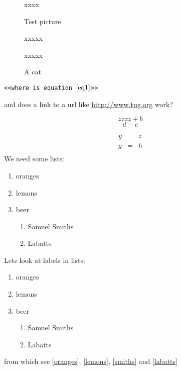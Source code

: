 \documentclass[]{book}
\newcommand{\eqnref}[1]{{equation~$\ref{#1}$}}
\begin{document}
\begin{figure}

xxxx

\hypertarget{testpiccy}{Test picture}

xxxxx

xxxxx
\caption{{A cat}}
\label{fig1}
\end{figure}

\texttt{<<where is \eqnref{eq1}>>}

and does a link to a url like \url{http://www.tug.org} work?

\begin{equation}
  \label{eq1}
  zzzz + b
\end{equation}
\newpage
\begin{equation}
  \label{eq2}
  d - e
\end{equation}

\begin{eqnarray}
  \label{eq3}
  y &=&z\\
  g &=&h\\
\end{eqnarray}
We need some lists:
\begin{enumerate}
\item oranges
\item lemons
\item beer
  \begin{enumerate}
  \item Samuel Smiths
  \item Labatts
  \end{enumerate}
\end{enumerate}

Lets look at labels in lists:
\begin{enumerate}
\item oranges\label{oranges}
\item lemons\label{lemons}
\item beer\label{beer}
  \begin{enumerate}
  \item Samuel Smiths\label{smiths}
  \item Labatts\label{labatts}
  \end{enumerate}
\end{enumerate}
\clearpage

from which see \ref{oranges}, \ref{lemons}, \ref{smiths} and
\ref{labatts}
\end{document}
